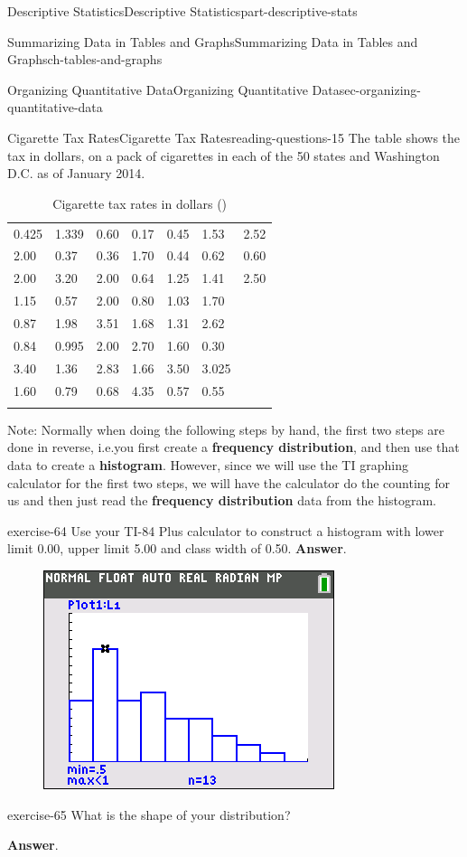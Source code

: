 \documentclass[oneside,10pt,]{book}
\newcommand{\terminology}[1]{\textbf{#1}}
\numberwithin{equation}{section}
\newcommand{\hrulethin}  {\noalign{\hrule height 0.04em}}
\newcommand{\hrulethick} {\noalign{\hrule height 0.11em}}
\begin{document}
\begin{partptx}{Descriptive Statistics}{}{Descriptive Statistics}{}{}{part-descriptive-stats}
\begin{chapterptx}{Summarizing Data in Tables and Graphs}{}{Summarizing Data in Tables and Graphs}{}{}{ch-tables-and-graphs}
\begin{sectionptx}{Organizing Quantitative Data}{}{Organizing Quantitative Data}{}{}{sec-organizing-quantitative-data}
\begin{reading-questions-subsection}{Cigarette Tax Rates}{}{Cigarette Tax Rates}{}{}{reading-questions-15}
\hypertarget{p-69}{}%
The table shows the tax in dollars, on a pack of cigarettes in each of the 50 states and Washington D.C. as of January 2014.%
\begin{table}
\centering
\begin{tabular}{lllllll}\hrulethick
0.425&1.339&0.60&0.17&0.45&1.53&2.52\tabularnewline\hrulethin
2.00&0.37&0.36&1.70&0.44&0.62&0.60\tabularnewline\hrulethin
2.00&3.20&2.00&0.64&1.25&1.41&2.50\tabularnewline\hrulethin
1.15&0.57&2.00&0.80&1.03&1.70&\tabularnewline\hrulethin
0.87&1.98&3.51&1.68&1.31&2.62&\tabularnewline\hrulethin
0.84&0.995&2.00&2.70&1.60&0.30&\tabularnewline\hrulethin
3.40&1.36&2.83&1.66&3.50&3.025&\tabularnewline\hrulethin
1.60&0.79&0.68&4.35&0.57&0.55&\tabularnewline\hrulethick
\end{tabular}
\caption{Cigarette tax rates in dollars (\textdollar{})\label{table-6}}
\end{table}
\hypertarget{p-70}{}%
Note: Normally when doing the following steps by hand, the first two steps are done in reverse, i.e.\@ you first create a \terminology{frequency distribution}, and then use that data to create a \terminology{histogram}. However, since we will use the TI graphing calculator for the first two steps, we will have the calculator do the counting for us and then just read the \terminology{frequency distribution} data from the histogram.%
\begin{divisionexercise}{1}{}{}{exercise-64}%
\hypertarget{p-71}{}%
Use your TI-84 Plus calculator to construct a histogram with lower limit \textdollar{}0.00, upper limit \textdollar{}5.00 and class width of \textdollar{}0.50.%
\textbf{Answer}.\quad%
\begin{figure}\centering\includegraphics[width=0.4\linewidth]{images/cigarette-tax-rates-histogram.png}
\end{figure}\end{divisionexercise}%
\begin{divisionexercise}{2}{}{}{exercise-65}%
\hypertarget{p-72}{}%
What is the shape of your distribution?%
\par\smallskip%
\noindent\textbf{Answer}.\hypertarget{answer-61}{}\quad%

\end{divisionexercise}
\end{reading-questions-subsection}
\end{sectionptx}
\end{chapterptx}
\end{partptx}
\end{document}
